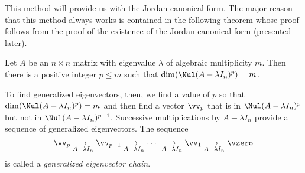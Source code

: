 This method will provide us with the Jordan canonical form. The major reason that this method always works is contained in the following theorem whose proof follows from the proof of the existence of the Jordan canonical form (presented later).


\begin{theorem} \label{thm:JCF_1} Let $A$ be an $n \times n$ matrix with eigenvalue $\lambda$ of algebraic multiplicity $m$. Then there is a positive integer $p \leq m$ such that $\dim(\Nul(A-\lambda I_n)^p) = m$. 
\end{theorem}


To find generalized eigenvectors, then, we find a value of $p$ so that $\dim(\Nul(A-\lambda I_n)^p) = m$ and then find a vector $\vv_p$ that is in $\Nul(A-\lambda I_n)^p$ but not in $\Nul(A-\lambda I_n)^{p-1}$. Successive multiplications by $A - \lambda I_n$ provide a sequence of generalized eigenvectors. The sequence
\[\vv_p \underset{A - \lambda I_n}{\rightarrow} \vv_{p-1} \underset{A - \lambda I_n}{\rightarrow}  \cdots \ \underset{A - \lambda I_n}{\rightarrow} \vv_1 \underset{A - \lambda I_n}{\rightarrow} \vzero\]
is called a \emph{generalized eigenvector chain}. 

